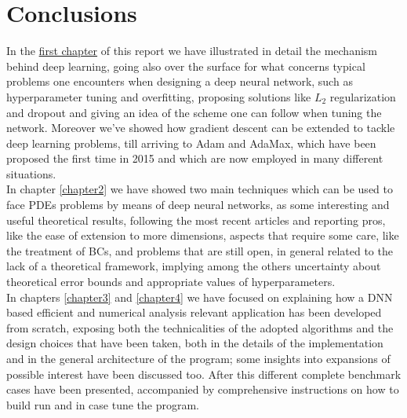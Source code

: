 \documentclass[12pt, a4paper]{report}
\theoremstyle{definition}
\begin{document}


\chapter*{Conclusions}
In the \hyperref[chapter1]{first chapter} of this report we have illustrated in detail the mechanism behind deep learning, going also over the surface for what concerns typical problems one encounters when designing a deep neural network, such as hyperparameter tuning and overfitting, proposing solutions like $L_2$ regularization and dropout and giving an idea of the scheme one can follow when tuning the network. Moreover we've showed how gradient descent can be extended to tackle deep learning problems, till arriving to Adam and AdaMax, which have been proposed the first time in 2015 and which are now employed in many different situations.\\
In chapter \ref{chapter2} we have showed two main techniques which can be used to face PDEs problems by means of deep neural networks, as some interesting and useful theoretical results, following the most recent articles and reporting pros, like the ease of extension to more dimensions, aspects that require some care, like the treatment of BCs, and problems that are still open, in general related to the lack of a theoretical framework, implying among the others uncertainty about theoretical error bounds and appropriate values of hyperparameters.\\
In chapters \ref{chapter3} and \ref{chapter4} we have focused on explaining how a DNN based efficient and numerical analysis relevant application has been developed from scratch, exposing both the technicalities of the adopted algorithms and the design choices that have been taken, both in the details of the implementation and in the general architecture of the program; some insights into expansions of possible interest have been discussed too. After this different complete benchmark cases have been presented, accompanied by comprehensive instructions on how to build run and in case tune the program.\\
\end{document}
